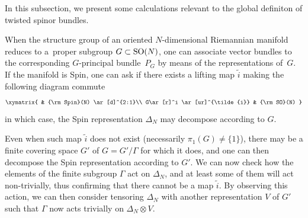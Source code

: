 \documentclass[pdftex]{sigma}
\numberwithin{equation}{section}
\begin{document}
In this subsection, we present some calculations relevant to the global def\/initon of twisted spinor bundles.

When the structure group of an oriented $N$-dimensional Riemannian manifold reduces to a~proper subgroup $G\subset {\rm SO}(N)$, one can associate vector bundles to the corresponding $G$-principal bundle~$P_G$ by means of the representations of~$G$. If the manifold is Spin, one can ask if there exists a lifting map $\tilde{i}$ making the following diagram commute
\begin{gather*}
\xymatrix{
 & {\rm Spin}(N) \ar[d]^{2:1}\\
G\ar[r]^i \ar[ur]^{\tilde{i}} & {\rm SO}(N)
}
\end{gather*}
in which case, the Spin representation $\Delta_N$ may decompose according to $G$.

Even when such map $\tilde{i}$ does not exist (necessarily $\pi_1(G)\not= \{1\}$), there may be a f\/inite covering space $G'$ of $G=G'/\Gamma$ for which it does, and one can then decompose the Spin representation according to $G'$. We can now check how the elements of the f\/inite subgroup $\Gamma$ act on $\Delta_N$, and at least some of them will act non-trivially, thus conf\/irming that there cannot be a map $\tilde{i}$. By observing this action, we can then consider tensoring $\Delta_N$ with another representation $V$ of $G'$ such that $\Gamma$ now acts trivially on $\Delta_N\otimes V$.
\end{document}
